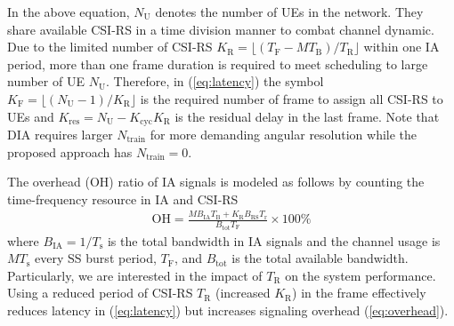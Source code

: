 \documentclass[journal]{IEEEtran}
\newcommand{\Ts}[0]{T_{\text{s}}}
\newcommand{\Tb}[0]{T_{\text{B}}}
\newcommand{\TSS}[0]{T_{\text{F}}}
\newcommand{\NUE}[0]{N_{\text{U}}}
\begin{document}
In the above equation, $\NUE$ denotes the number of UEs in the network. They share available CSI-RS in a time division manner to combat channel dynamic. Due to the limited number of CSI-RS $K_{\text{R}} = \lfloor(\TSS-MT_{\text{B}})/T_{\text{R}}\rfloor$ within one IA period, more than one frame duration is required to meet scheduling to large number of UE $\NUE$. Therefore, in (\ref{eq:latency}) the symbol $K_{\text{F}} = \lfloor (\NUE-1)/K_{\text{R}}\rfloor$ is the required number of frame to assign all CSI-RS to UEs and $K_{\text{res}} = \NUE - K_{\text{cyc}}K_{\text{R}}$ is the residual delay in the last frame. Note that DIA requires larger $N_{\text{train}}$ for more demanding angular resolution while the proposed approach has $N_{\text{train}} = 0$.






% 
%
The overhead (OH) ratio of IA signals is modeled as follows by counting the time-frequency resource in IA and CSI-RS \cite{Giordani_beam_turotial_arxiv_1804}
\begin{align}
\text{OH} = \frac{MB_{\text{IA}}\Tb + K_{\text{R}}B_{\text{RS}}T_{\text{r}}}{B_{\text{tot}}\TSS} \times 100\%
\label{eq:overhead}
\end{align}
where $B_{\text{IA}} = 1/T_{\text{s}}$ is the total bandwidth in IA signals and the channel usage is $M\Ts$ every SS burst period, $\TSS$, and $B_{\text{tot}}$ is the total available bandwidth. Particularly, we are interested in the impact of $T_{\text{R}}$ on the system performance. Using a reduced period of CSI-RS $T_{\text{R}}$ (increased $K_{\text{R}}$) in the frame effectively reduces latency in (\ref{eq:latency}) but increases signaling overhead (\ref{eq:overhead}).
\end{document}
